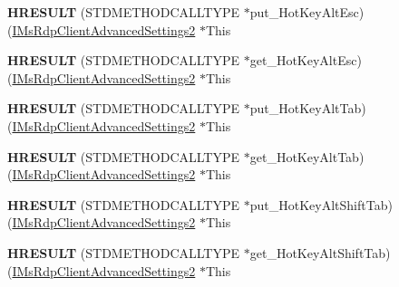 \begin{DoxyCompactItemize}
{\bfseries H\+R\+E\+S\+U\+LT} (S\+T\+D\+M\+E\+T\+H\+O\+D\+C\+A\+L\+L\+T\+Y\+PE $\ast$put\+\_\+\+Hot\+Key\+Alt\+Esc)(\hyperlink{interface_m_s_t_s_c_lib_1_1_i_ms_rdp_client_advanced_settings2}{I\+Ms\+Rdp\+Client\+Advanced\+Settings2} $\ast$This
\item 
\mbox{\label{struct_m_s_t_s_c_lib_1_1_i_ms_rdp_client_advanced_settings2_vtbl_a2f2b24bb143600dcc44dda8e8ff9d475}} 
{\bfseries H\+R\+E\+S\+U\+LT} (S\+T\+D\+M\+E\+T\+H\+O\+D\+C\+A\+L\+L\+T\+Y\+PE $\ast$get\+\_\+\+Hot\+Key\+Alt\+Esc)(\hyperlink{interface_m_s_t_s_c_lib_1_1_i_ms_rdp_client_advanced_settings2}{I\+Ms\+Rdp\+Client\+Advanced\+Settings2} $\ast$This
\item 
\mbox{\label{struct_m_s_t_s_c_lib_1_1_i_ms_rdp_client_advanced_settings2_vtbl_a38b8379fbb1d2eab28cfd0cf588cb0bc}} 
{\bfseries H\+R\+E\+S\+U\+LT} (S\+T\+D\+M\+E\+T\+H\+O\+D\+C\+A\+L\+L\+T\+Y\+PE $\ast$put\+\_\+\+Hot\+Key\+Alt\+Tab)(\hyperlink{interface_m_s_t_s_c_lib_1_1_i_ms_rdp_client_advanced_settings2}{I\+Ms\+Rdp\+Client\+Advanced\+Settings2} $\ast$This
\item 
\mbox{\label{struct_m_s_t_s_c_lib_1_1_i_ms_rdp_client_advanced_settings2_vtbl_a17464947f11265c60e1a5702c82d6669}} 
{\bfseries H\+R\+E\+S\+U\+LT} (S\+T\+D\+M\+E\+T\+H\+O\+D\+C\+A\+L\+L\+T\+Y\+PE $\ast$get\+\_\+\+Hot\+Key\+Alt\+Tab)(\hyperlink{interface_m_s_t_s_c_lib_1_1_i_ms_rdp_client_advanced_settings2}{I\+Ms\+Rdp\+Client\+Advanced\+Settings2} $\ast$This
\item 
\mbox{\label{struct_m_s_t_s_c_lib_1_1_i_ms_rdp_client_advanced_settings2_vtbl_a6758229a6e5a00a5834a7847d2a9f47c}} 
{\bfseries H\+R\+E\+S\+U\+LT} (S\+T\+D\+M\+E\+T\+H\+O\+D\+C\+A\+L\+L\+T\+Y\+PE $\ast$put\+\_\+\+Hot\+Key\+Alt\+Shift\+Tab)(\hyperlink{interface_m_s_t_s_c_lib_1_1_i_ms_rdp_client_advanced_settings2}{I\+Ms\+Rdp\+Client\+Advanced\+Settings2} $\ast$This
\item 
\mbox{\label{struct_m_s_t_s_c_lib_1_1_i_ms_rdp_client_advanced_settings2_vtbl_a181318d3f021aa0fba4d2472f68b6a9c}} 
{\bfseries H\+R\+E\+S\+U\+LT} (S\+T\+D\+M\+E\+T\+H\+O\+D\+C\+A\+L\+L\+T\+Y\+PE $\ast$get\+\_\+\+Hot\+Key\+Alt\+Shift\+Tab)(\hyperlink{interface_m_s_t_s_c_lib_1_1_i_ms_rdp_client_advanced_settings2}{I\+Ms\+Rdp\+Client\+Advanced\+Settings2} $\ast$This

\end{DoxyCompactItemize}
